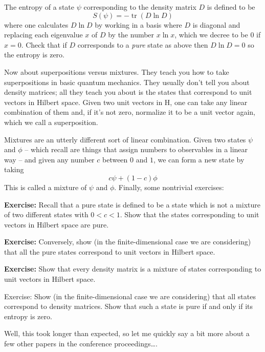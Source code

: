 \documentclass{article}
\begin{document}
The entropy of a state \(\psi\) corresponding to the density matrix
\(D\) is defined to be \[S(\psi) = -\operatorname{tr}(D \ln D)\] where
one calculates \(D \ln D\) by working in a basis where \(D\) is diagonal
and replacing each eigenvalue \(x\) of \(D\) by the number \(x \ln x\),
which we decree to be \(0\) if \(x = 0\). Check that if \(D\)
corresponds to a \emph{pure} state as above then \(D \ln D = 0\) so the
entropy is zero.

Now about superpositions versus mixtures. They teach you how to take
superpositions in basic quantum mechanics. They usually don't tell you
about density matrices; all they teach you about is the states that
correspond to unit vectors in Hilbert space. Given two unit vectors in
H, one can take any linear combination of them and, if it's not zero,
normalize it to be a unit vector again, which we call a superposition.

Mixtures are an utterly different sort of linear combination. Given two
states \(\psi\) and \(\phi\) -- which recall are things that assign
numbers to observables in a linear way -- and given any number \(c\)
between \(0\) and \(1\), we can form a new state by taking
\[c \psi + (1-c) \phi\] This is called a mixture of \(\psi\) and
\(\phi\). Finally, some nontrivial exercises:

\textbf{Exercise:} Recall that a pure state is defined to be a state
which is not a mixture of two different states with \(0 < c < 1\). Show
that the states corresponding to unit vectors in Hilbert space are pure.

\textbf{Exercise:} Conversely, show (in the finite-dimensional case we
are considering) that all the pure states correspond to unit vectors in
Hilbert space.

\textbf{Exercise:} Show that every density matrix is a mixture of states
corresponding to unit vectors in Hilbert space.

Exercise: Show (in the finite-dimensional case we are considering) that
all states correspond to density matrices. Show that such a state is
pure if and only if its entropy is zero.

Well, this took longer than expected, so let me quickly say a bit more
about a few other papers in the conference proceedings\ldots.
\end{document}
